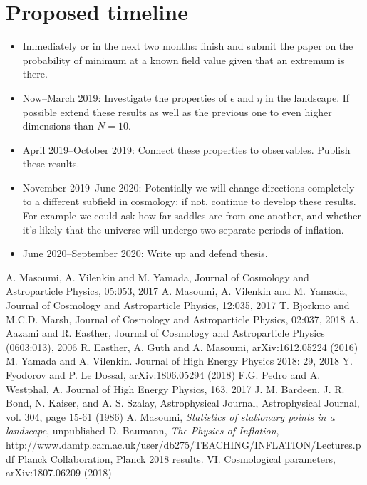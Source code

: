 \documentclass[12pt]{article}
\begin{document}
\section{Proposed timeline}
\begin{itemize}
\item Immediately or in the next two months: finish and submit the paper on the probability of minimum at a known field value given that an extremum is there.
\item Now--March 2019: Investigate the properties of $\epsilon$ and $\eta$ in the landscape. If possible extend these results as well as the previous one to even higher dimensions than $N=10$.
\item April 2019--October 2019: Connect these properties to observables. Publish these results.
\item November 2019--June 2020: Potentially we will change directions completely to a different subfield in cosmology; if not, continue to develop these results. For example we could ask how far saddles are from one another, and whether it's likely that the universe will undergo two separate periods of inflation.
\item June 2020--September 2020: Write up and defend thesis.
\end{itemize}

\begin{thebibliography}{99}
 A. Masoumi, A. Vilenkin and M. Yamada, Journal of Cosmology and Astroparticle Physics, 05:053, 2017
 A. Masoumi, A. Vilenkin and M. Yamada, Journal of Cosmology and Astroparticle Physics, 12:035, 2017
 T. Bjorkmo and M.C.D. Marsh, Journal of Cosmology and Astroparticle Physics, 02:037, 2018
 A. Aazami and R. Easther, Journal of Cosmology and Astroparticle Physics (0603:013), 2006
 R. Easther, A. Guth and A. Masoumi, arXiv:1612.05224 (2016)
 M. Yamada and A. Vilenkin. Journal of High Energy Physics 2018: 29, 2018
 Y. Fyodorov and P. Le Dossal, arXiv:1806.05294 (2018)
 F.G. Pedro and A. Westphal, A. Journal of High Energy Physics, 163, 2017
 J. M. Bardeen, J. R. Bond, N. Kaiser, and A. S. Szalay, Astrophysical Journal, Astrophysical Journal, vol. 304, page 15-61 (1986)
 A. Masoumi, \emph{Statistics of stationary points in a landscape}, unpublished
 D. Baumann, \emph{The Physics of Inflation}, http://www.damtp.cam.ac.uk/user/db275/TEACHING/INFLATION/Lectures.pdf
 Planck Collaboration, Planck 2018 results. VI. Cosmological parameters, arXiv:1807.06209 (2018)

\end{thebibliography}
\end{document}
